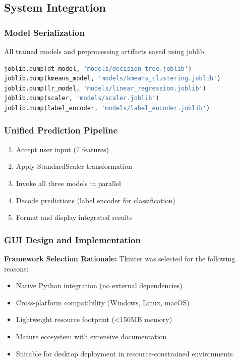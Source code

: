\documentclass[conference]{IEEEtran}
\begin{document}
\subsection{System Integration}

\subsubsection{Model Serialization}
All trained models and preprocessing artifacts saved using joblib:
\begin{lstlisting}[language=Python, basicstyle=\tiny]
joblib.dump(dt_model, 'models/decision_tree.joblib')
joblib.dump(kmeans_model, 'models/kmeans_clustering.joblib')
joblib.dump(lr_model, 'models/linear_regression.joblib')
joblib.dump(scaler, 'models/scaler.joblib')
joblib.dump(label_encoder, 'models/label_encoder.joblib')
\end{lstlisting}

\subsubsection{Unified Prediction Pipeline}
\begin{enumerate}
    \item Accept user input (7 features)
    \item Apply StandardScaler transformation
    \item Invoke all three models in parallel
    \item Decode predictions (label encoder for classification)
    \item Format and display integrated results
\end{enumerate}

\subsubsection{GUI Design and Implementation}

\textbf{Framework Selection Rationale:}
Tkinter was selected for the following reasons:
\begin{itemize}
    \item Native Python integration (no external dependencies)
    \item Cross-platform compatibility (Windows, Linux, macOS)
    \item Lightweight resource footprint (<150MB memory)
    \item Mature ecosystem with extensive documentation
    \item Suitable for desktop deployment in resource-constrained environments
\end{itemize}
\end{document}
